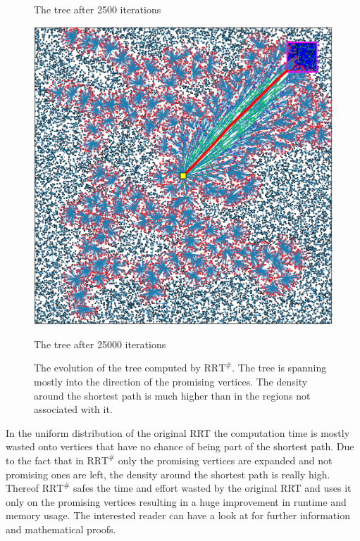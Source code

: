 \documentclass[conference]{IEEEtran}
\begin{document}
\begin{figure}[h]
\begin{minipage}[t]{0.3\linewidth}
\caption{The tree after 2500 iterations}
\end{minipage}
\hfill
\begin{minipage}[t]{0.3\linewidth}
\centering
\includegraphics[width=1\textwidth]{images/RRT/ARSLAN/03_v.png}
\caption{The tree after 25000 iterations}
\end{minipage}
\caption{The evolution of the tree computed by $\text{RRT}^\#$. The tree is spanning mostly into the direction of the promising vertices. The density around the shortest path is much higher than in the regions not associated with it.}
\end{figure}

In the uniform distribution of the original RRT the computation time is mostly wasted onto vertices that have no chance of being part of the shortest path. Due to the fact that in $\text{RRT}^\#$ only the promising vertices are expanded and not promising ones are left, the density around the shortest path is really high. Thereof $\text{RRT}^\#$ safes the time and effort wasted by the original RRT and uses it only on the promising vertices resulting in a huge improvement in runtime and memory usage.
The interested reader can have a look at \cite{OktayArslan.December2015} for further information and mathematical proofs.

\newpage
\end{document}
